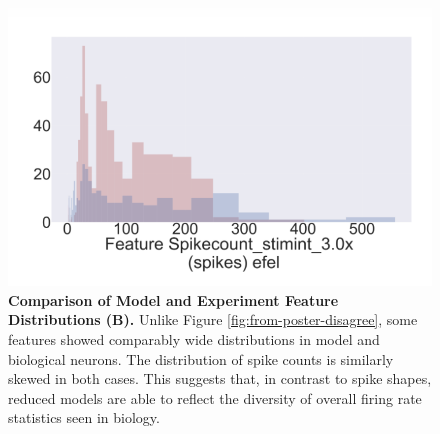\begin{figure}
    \centering
    \includegraphics[scale=0.75]{figures/spike_count_at_3rheobase.png}
    \caption[Comparison of Model and Experiment Feature Distributions (B)]{\textbf{Comparison of Model and Experiment Feature Distributions (B).} Unlike Figure \ref{fig:from-poster-disagree}, some features showed comparably wide distributions in model and biological neurons.
    The distribution of spike counts is similarly skewed in both cases.
    This suggests that, in contrast to spike shapes, reduced models are able to reflect the diversity of overall firing rate statistics seen in biology.
    }
    \label{fig:from_poster_disagree}
\end{figure}


